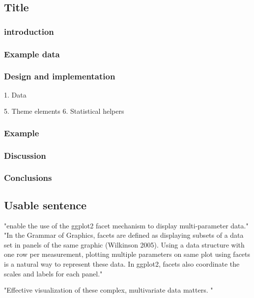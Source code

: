 \documentclass[article]{jss}
\begin{document}
\subsection{Title}
\subsubsection{introduction}
\subsubsection{Example data}
\subsubsection{Design and implementation}
1. Data



5. Theme elements
6. Statistical helpers %
\subsubsection{Example}
\subsubsection{Discussion}
\subsubsection{Conclusions}

\subsection{Usable sentence}
"enable the use of the ggplot2 facet mechanism to display multi-parameter
data."
"In the Grammar of Graphics, facets are defined as displaying subsets of a data set in panels
of the same graphic (Wilkinson 2005). Using a data structure with one row per measurement,
plotting multiple parameters on same plot using facets is a natural way to represent these
data. In ggplot2, facets also coordinate the scales and labels for each panel."



"Effective visualization of these complex, multivariate data matters. "
\end{document}

